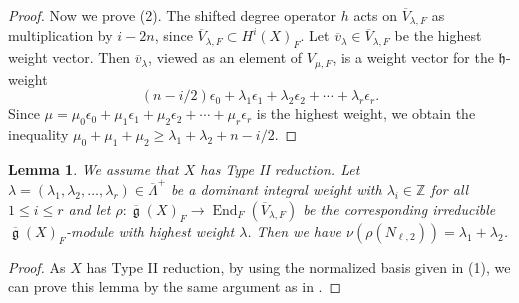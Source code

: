 \documentclass[12pt,reqno]{amsart}
\newtheorem{lem}[thm]{Lemma}
\theoremstyle{definition}
\newcommand{\Z}{{\mathds Z}}
\newcommand\End{\mathop{\mathrm{End}}\nolimits}
\renewcommand\ge{\mathop{\mathfrak{g}}\nolimits}
\newcommand{\frh}{\mathfrak{h}}
\numberwithin{equation}{section}
\begin{document}
\begin{proof}
Now we prove (2).
The shifted degree operator $h$ acts on 
$\overline{V}_{\lambda, F}$ as multiplication by $i-2n$, since $\overline{V}_{\lambda, F} \subset H^i(X)_F$.
Let $\overline{v}_\lambda \in \overline{V}_{\lambda, F}$ be the highest weight vector.
Then $\overline{v}_\lambda$, viewed as an element of $V_{\mu, F}$, is a weight vector for the $\frh$-weight
\[
  (n-i/2) \epsilon_0 + \lambda_1\epsilon_1 + \lambda_2\epsilon_2 + \cdots +\lambda_r\epsilon_r.
\]
Since $\mu= 
\mu_0\epsilon_0 + \mu_1\epsilon_1 + \mu_2\epsilon_2 + \cdots +\mu_r\epsilon_r$ is the highest  weight, we obtain the inequality
$\mu_0 + \mu_1 + \mu_2  \geq \lambda_1 + \lambda_2 + n - i/2$.
\end{proof}



\begin{lem}\label{Lemma:nilpotency index for irreducible factors}
    We assume that $X$ has Type II reduction.
    Let $\lambda = (\lambda_1, \lambda_2, \dotsc, \lambda_r) \in \overline{\Lambda}^+$ be a dominant integral weight with $\lambda_i \in \Z$ for all $1 \leq i \leq r$ and let
    $\rho \colon \overline{\ge}(X)_F \to \End_F(\overline{V}_{\lambda, F})$
    be the corresponding irreducible $\overline{\ge}(X)_F$-module with highest weight $\lambda$.
    Then we have $\nu(\rho(N_{\ell, 2}))= \lambda_1 + \lambda_2$.
\end{lem}

\begin{proof}
As $X$ has Type II reduction,
    by using the normalized basis given in  (1), we can prove this lemma by the same argument as in \cite[Lemma 5.8]{GKLR}.
\end{proof}
\end{document}
